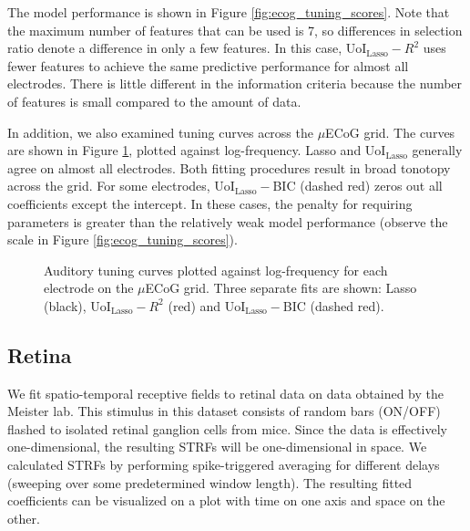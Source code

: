 \documentclass[11pt]{article}
\begin{document}
The model performance is shown in Figure \ref{fig:ecog_tuning_scores}. Note that the maximum number of features that can be used is 7, so differences in selection ratio denote a difference in only a few features. In this case, UoI$_{\text{Lasso}}-R^2$ uses fewer features to achieve the same predictive performance for almost all electrodes. There is little different in the information criteria because the number of features is small compared to the amount of data.

In addition, we also examined tuning curves across the $\mu$ECoG grid. The curves are shown in Figure \ref{fig:ecog_tuning_curves}, plotted against log-frequency. Lasso and UoI$_{\text{Lasso}}$ generally agree on almost all electrodes. Both fitting procedures result in broad tonotopy across the grid. For some electrodes, UoI$_{\text{Lasso}}-$BIC (dashed red) zeros out all coefficients except the intercept. In these cases, the penalty for requiring parameters is greater than the relatively weak model performance (observe the scale in Figure \ref{fig:ecog_tuning_scores}).
\begin{figure}[b!]
	\centering

	\caption{Auditory tuning curves plotted against log-frequency for each electrode on the $\mu$ECoG grid. Three separate fits are shown: Lasso (black), UoI$_{\text{Lasso}}-R^2$ (red) and UoI$_{\text{Lasso}}-$BIC (dashed red).}
	\label{fig:ecog_tuning_curves}
\end{figure}

\subsection{Retina}

We fit spatio-temporal receptive fields to retinal data on data obtained by the Meister lab. This stimulus in this dataset consists of random bars (ON/OFF) flashed to isolated retinal ganglion cells from mice. Since the data is effectively one-dimensional, the resulting STRFs will be one-dimensional in space. We calculated STRFs by performing spike-triggered averaging for different delays (sweeping over some predetermined window length). The resulting fitted coefficients can be visualized on a plot with time on one axis and space on the other.
\end{document}
